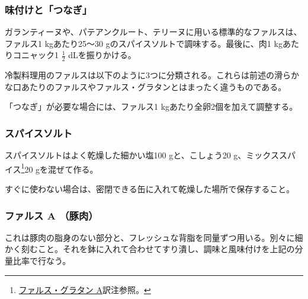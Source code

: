 \begin{recette}

\hypertarget{assaisonnement-et-liaison}{%
\subsubsection{味付けと「つなぎ」}\label{assaisonnement-et-liaison}}


ガランティーヌや、パテアンクルート、テリーヌに用いる標準的なファルスは、ファルス1
kgあたり25〜30 gのスパイスソルトで調味する。最後に、肉1
kgあたりコニャック1 \(\frac{1}{2}\) dLを振りかける。

\vspace*{.5\zw}

冷製料理用のファルスは以下のように3つに分類される。これらは前述の滑らかな口あたりのファルスやファルス・グラタンとはまったく違うものである。

「つなぎ」が必要な場合には、ファルス1 kgあたり全卵2個を加えて調整する。

\atoaki{}

\hypertarget{sel-epice}{%
\subsubsection{スパイスソルト}\label{sel-epice}}


 

スパイスソルトはよく乾燥した細かい塩100 gと、こしょう20
g、ミックススパイス\footnote{\protect\hyperlink{farce-gratin-a}{ファルス・グラタン
  A}訳注参照。}20 gを混ぜて作る。

すぐに使わない場合は、密閉できる缶に入れて乾燥した場所で保存すること。

\atoaki{}

\hypertarget{farce-froide-a}{%
\subsubsection{ファルス A （豚肉）}\label{farce-froide-a}}



これは豚肉の脂身のない部分と、フレッシュな背脂を同量ずつ用いる。別々に細かく刻むこと。それを鉢に入れて合わせてすり潰し、調味と風味付けを上記の分量比率で行なう。


\end{recette}
